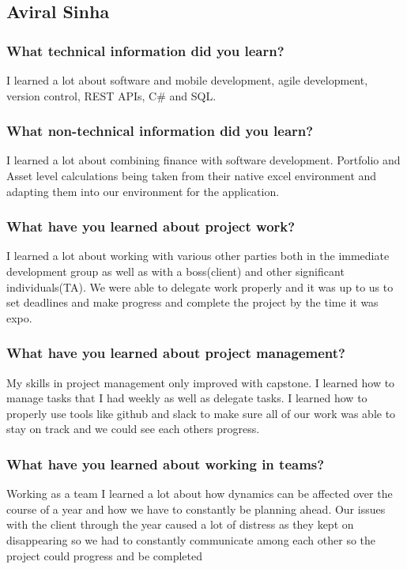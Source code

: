 \documentclass[onecolumn, draftclsnofoot,10pt, compsoc]{IEEEtran}
\begin{document}
\subsection{Aviral Sinha}

\subsubsection{What technical information did you learn?} 
I learned a lot about software and mobile development, agile development, version control, REST APIs, C\# and SQL.

\subsubsection{What non-technical information did you learn?} 
I learned a lot about combining finance with software development. Portfolio and Asset level calculations being taken from their native excel environment and adapting them into our environment for the application.

    
\subsubsection{What have you learned about project work?} 
I learned a lot about working with various other parties both in the immediate development group as well as with a boss(client) and other significant individuals(TA). We were able to delegate work properly and it was up to us to set deadlines and make progress and complete the project by the time it was expo. 
    
\subsubsection{What have you learned about project management?} 
My skills in project management only improved with capstone. I learned how to manage tasks that I had weekly as well as delegate tasks. I learned how to properly use tools like github and slack  to make sure all of our work was able to stay on track and we could see each others progress.
    
\subsubsection{What have you learned about working in teams?}
Working as a team I learned a lot about how dynamics can be affected over the course of a year and how we have to constantly be planning ahead. Our issues with the client through the year caused a lot of distress as they kept on disappearing so we had to constantly communicate among each other so the project could progress and be completed 
    
\end{document}
